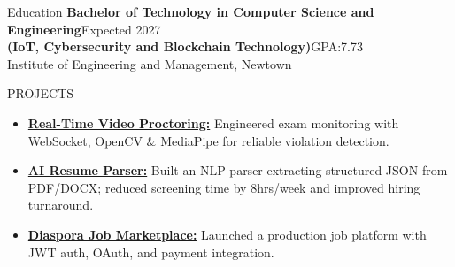 \documentclass{resume}
\begin{document}
\begin{rSection}{Education}
  \textbf{Bachelor of Technology in Computer Science and Engineering}\hfill {Expected 2027}\\
  \textbf{(IoT, Cybersecurity and Blockchain Technology)}\hfill {GPA:7.73}\\
  Institute of Engineering and Management, Newtown 
\end{rSection}
\vspace{-0.2cm}

\begin{rSection}{PROJECTS}
\begin{itemize}
  \item \textbf{\href{https://github.com/Soumika-11/Video-Proctor}{Real-Time Video Proctoring:}} Engineered exam monitoring with WebSocket, OpenCV \& MediaPipe for reliable violation detection.
  \item \textbf{\href{https://github.com/Soumika-11/Resume-Parser}{AI Resume Parser:}} Built an NLP parser extracting structured JSON from PDF/DOCX; reduced screening time by 8hrs/week and improved hiring turnaround.
  \item \textbf{\href{https://www.diasporaworks.com}{Diaspora Job Marketplace:}} Launched a production job platform with JWT auth, OAuth, and payment integration.
\end{itemize}
\end{rSection}
\vspace{-0.2cm}
\end{document}
